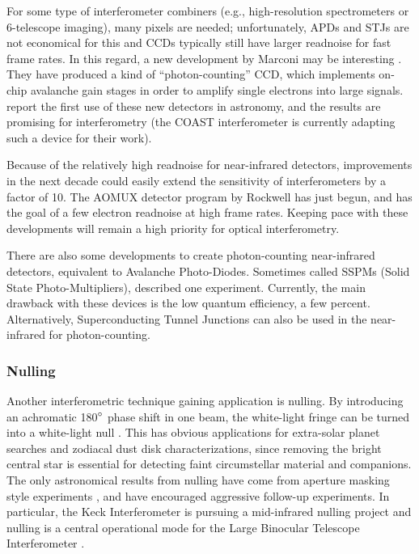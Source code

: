 \documentclass[12pt]{article}
\def\arcdegg{\hbox{$^\circ$}}
\begin{document}
For some type of interferometer combiners (e.g., high-resolution
spectrometers or 6-telescope imaging), many pixels are needed;
unfortunately, APDs and STJs are not economical for this and CCDs
typically still have larger readnoise for fast frame rates.  In this
regard, a new development by Marconi may be interesting
\citep{mackay2001}. They have produced a kind of ``photon-counting''
CCD, which implements on-chip avalanche gain stages in order to
amplify single electrons into large signals.  \citet{tubbs2002} report
the first use of these new detectors in astronomy, and the results are
promising for interferometry (the COAST interferometer is currently
adapting such a device for their work).

Because of the relatively high readnoise for near-infrared detectors,
improvements in the next decade could easily extend the sensitivity of
interferometers by a factor of 10. The AOMUX detector program by
Rockwell has just begun, and has the goal of a few electron readnoise
at high frame rates.  Keeping pace with these developments will remain
a high priority for optical interferometry.

There are also some developments to create photon-counting
near-infrared detectors, equivalent to Avalanche Photo-Diodes.
Sometimes called SSPMs (Solid State Photo-Multipliers),
\citet{eikenberry1996} described one experiment. Currently, the main
drawback with these devices is the low quantum efficiency, a few
percent.  Alternatively, Superconducting Tunnel Junctions can also be
used in the near-infrared for photon-counting.


\subsubsection{Nulling}
\label{nulling}
Another interferometric technique gaining application is nulling.  By
introducing an achromatic 180$\arcdegg$ phase shift in one beam, the
white-light fringe can be turned into a white-light null
\citep{bracewell1978}.  This has obvious applications for extra-solar
planet searches and zodiacal dust disk characterizations, since
removing the bright central star is essential for detecting faint
circumstellar material and companions.  The only astronomical results
from nulling have come from aperture masking style experiments
\citep[e.g.,][]{hinz1998,hinzthesis,hinz2001},  and have encouraged
aggressive follow-up experiments.  In particular, the Keck
Interferometer is pursuing a mid-infrared nulling project
\citep{serabyn2001} and nulling is a central operational mode for the
Large Binocular Telescope Interferometer \citep{hinz2001b}.  
\end{document}
